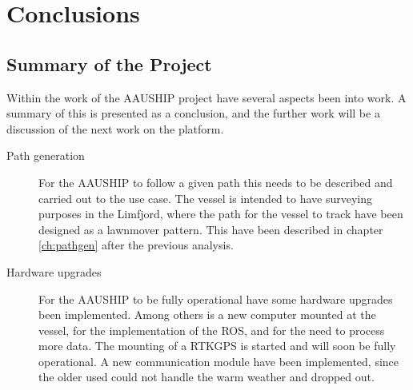 \section{Conclusions}
\label{sc:FW}

\subsection{Summary of the Project}
Within the work of the AAUSHIP project have several aspects been into work. A summary of this is presented as a conclusion, and the further work will be a discussion of the next work on the platform.
\begin{description}
\item[Path generation] For the AAUSHIP to follow a given path this needs to be described and carried out to the use case. The vessel is intended to have surveying purposes in the Limfjord, where the path for the vessel to track have been designed as a lawnmover pattern. This have been described in chapter \ref{ch:pathgen} after the previous analysis.
\item[Hardware upgrades] For the AAUSHIP to be fully operational have some hardware upgrades been implemented. Among others is a new computer mounted at the vessel, for the implementation of the \ac{ROS}, and for the need to process more data. The mounting of a \ac{RTK}\ac{GPS} is started and will soon be fully operational. A new communication module have been implemented, since the older used could not handle the warm weather and dropped out.

\end{description}
